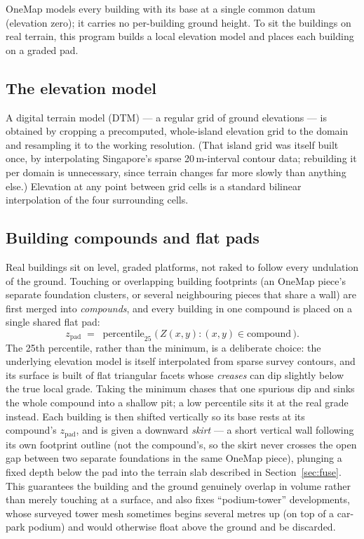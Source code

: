 \documentclass[11pt]{article}
\begin{document}
OneMap models every building with its base at a single common datum (elevation zero); it carries
no per-building ground height. To sit the buildings on real terrain, this program builds a
local elevation model and places each building on a graded pad.

\subsection{The elevation model}

A digital terrain model (DTM) --- a regular grid of ground elevations --- is obtained by
cropping a precomputed, whole-island elevation grid to the domain and resampling it to the
working resolution. (That island grid was itself built once, by interpolating Singapore's sparse
20\,m-interval contour data; rebuilding it per domain is unnecessary, since terrain changes far
more slowly than anything else.) Elevation at any point between grid cells is a standard bilinear
interpolation of the four surrounding cells.

\subsection{Building compounds and flat pads}
\label{sec:compounds}

Real buildings sit on level, graded platforms, not raked to follow every undulation of the
ground. Touching or overlapping building footprints (an OneMap piece's separate foundation
clusters, or several neighbouring pieces that share a wall) are first merged into
\emph{compounds}, and every building in one compound is placed on a single shared flat pad:
\[
  z_{\text{pad}} \;=\; \operatorname{percentile}_{25}\Big(\, Z(x,y) : (x,y) \in \text{compound}\, \Big).
\]
The 25th percentile, rather than the minimum, is a deliberate choice: the underlying elevation
model is itself interpolated from sparse survey contours, and its surface is built of flat
triangular facets whose \emph{creases} can dip slightly below the true local grade. Taking the
minimum chases that one spurious dip and sinks the whole compound into a shallow pit; a low
percentile sits it at the real grade instead. Each building is then shifted vertically so its
base rests at its compound's $z_{\text{pad}}$, and is given a downward \emph{skirt} --- a short
vertical wall following its own footprint outline (not the compound's, so the skirt never crosses
the open gap between two separate foundations in the same OneMap piece), plunging a fixed depth
below the pad into the terrain slab described in Section~\ref{sec:fuse}. This guarantees the
building and the ground genuinely overlap in volume rather than merely touching at a surface, and
also fixes ``podium-tower'' developments, whose surveyed tower mesh sometimes begins several
metres up (on top of a car-park podium) and would otherwise float above the ground and be
discarded.
\end{document}
